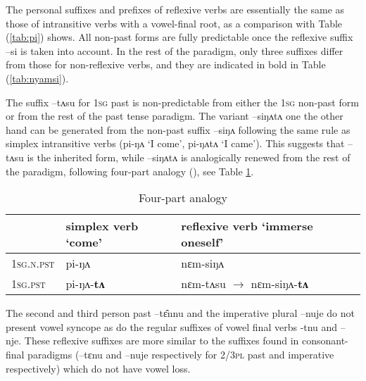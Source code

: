 \documentclass[twoside,a4paper,11pt]{article}
\newcommand{\ipa}[1]{{\phon#1}}
\begin{document}
 The personal suffixes and prefixes of reflexive verbs are essentially the same as those of  intransitive verbs with a vowel-final root, as a comparison with Table (\ref{tab:pi}) shows. All non-past forms are fully predictable once the reflexive suffix \ipa{--si} is taken into account. In the rest of the paradigm,  only three suffixes   differ  from those for non-reflexive verbs, and they are indicated in bold in Table (\ref{tab:nyamsi}).
 
   The   suffix \ipa{--tʌsu} for \textsc{1sg} past  is non-predictable from either the \textsc{1sg} non-past form or from the rest of the past tense paradigm. The variant \ipa{--siŋʌtʌ} one the other hand can be generated from the non-past suffix \ipa{--siŋʌ} following the same rule as simplex intransitive verbs (\ipa{pi-ŋʌ} `I come', \ipa{pi-ŋʌtʌ} `I came'). This   suggests that  \ipa{--tʌsu} is the inherited form, while  \ipa{--siŋʌtʌ} is analogically renewed from the rest of the paradigm, following four-part analogy (\citealt[167-175]{hock91principles}), see Table \ref{tab:four}.

 \begin{table}[h]
\caption{Four-part analogy}  \label{tab:four} \centering
\begin{tabular}{l|l|ll}
\toprule
  & simplex verb `come' & reflexive verb `immerse oneself' \\
 \midrule
\textsc{1sg.n.pst} &\ipa{pi-ŋʌ} & \ipa{nɛm-siŋʌ} \\
\textsc{1sg.pst}  &\ipa{pi-ŋʌ-\textbf{tʌ}} & \ipa{nɛm-tʌsu} $\rightarrow$ \ipa{nɛm-siŋʌ-\textbf{tʌ}} \\
\bottomrule			
\end{tabular}
\end{table} 

 
 The second and third person past \ipa{--tɛ̂nnu} and  the imperative plural \ipa{--nuje} do not present vowel syncope as do the regular  suffixes of vowel final verbs \ipa{-tnu} and \ipa{--nje}. These reflexive suffixes are more similar to the suffixes found in   consonant-final paradigms (\ipa{--tɛnu} and \ipa{--nuje} respectively for \textsc{2/3pl} past and imperative respectively) which do not have vowel loss.
 
\end{document}
